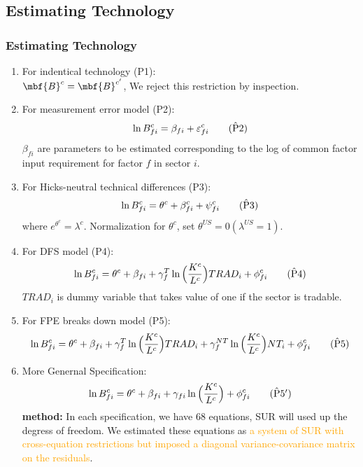 \documentclass[xcolor=svgnames,10pt]{beamer}
\begin{document}
\subsection{Estimating Technology}
\begin{frame}[allowframebreaks]\frametitle{Estimating Technology}
\begin{enumerate}
\item For indentical technology (P1): \\
$\mbf{B}^{c}=\mbf{B}^{c^{\prime}}$, We reject this restriction by inspection.
\item For measurement error model (P2):
\begin{equation}
\ln B_{fi}^{c} = \beta_{fi} + \varepsilon_{fi}^{c} \tag{$\hat{\text{P}}2$}
\end{equation}
$\beta_{fi}$ are parameters to be estimated corresponding to the log of common factor input requirement for factor $f$ in sector $i$.
\item For Hicks-neutral technical differences (P3):
\begin{equation}
\ln B_{fi}^{c} = \theta^{c}+\beta_{fi}^{c}+\psi_{fi}^{c} \tag{$\hat{\text{P}}3$}
\end{equation}
where $e^{\theta^{c}} = \lambda^{c}$. Normalization for $\theta^{c}$, set $\theta^{US}=0 (\lambda^{US}=1)$.
\item For DFS model (P4):
\begin{equation}
\ln B_{fi}^{c} = \theta^{c} + \beta_{fi}+\gamma_{f}^{T}\ln\Big(\frac{K^{c}}{L^{c}}\Big) TRAD_{i} + \phi_{fi}^{c} \tag{$\hat{\text{P}}4$}
\end{equation}
$TRAD_{i}$ is dummy variable that takes value of one if the sector is tradable.
\item For FPE breaks down model (P5):
\begin{equation}
\ln B_{fi}^{c} = \theta^{c} + \beta_{fi}+\gamma_{f}^{T}\ln\Big(\frac{K^{c}}{L^{c}}\Big) TRAD_{i}  + \gamma_{f}^{NT}\ln\Big(\frac{K^{c}}{L^{c}}\Big) NT_{i} + \phi_{fi}^{c} \tag{$\hat{\text{P}}5$}
\end{equation}
\item More Genernal Specification:
\begin{equation}
\ln B_{fi}^{c} = \theta^{c} + \beta_{fi}+\gamma_{fi}\ln\Big(\frac{K^{c}}{L^{c}}\Big)  + \phi_{fi}^{c} \tag{$\hat{\text{P}}5^{\prime}$}
\end{equation}
\textbf{method:} In each specification, we have 68 equations, SUR will used up the degress of freedom. We estimated these equations as \textcolor{orange}{a system of SUR with cross-equation restrictions but imposed a diagonal variance-covariance matrix on the residuals}.
\end{enumerate}
\end{frame}
\end{document}
